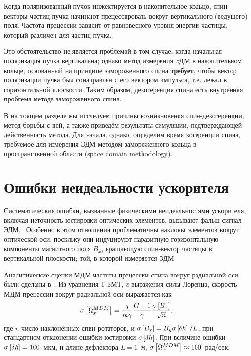 Когда поляризованный пучок инжектируется в накопительное кольцо, спин-векторы 
частиц пучка начинают прецессировать вокруг вертикального
(ведущего) поля. Частота прецессии зависит от равновесного уровня
энергии частицы, который различен для частиц пучка.

Это обстоятельство не является проблемой в том случае, когда начальная
поляризация пучка вертикальна; однако метод измерения ЭДМ в
накопительном кольце, основанный
на принципе замороженного спина \textbf{требует}, чтобы вектор поляризации
пучка был сонаправлен с его вектором импульса, т.е. лежал в
горизонтальной плоскости. Таким образом, декогеренция спина есть
внутренняя проблема метода замороженного спина.

В настоящем разделе мы исследуем причины возникновения спин-декогеренции,
метод борьбы с ней, а также приведём результаты симуляции, подтверждающей действенность
метода. Для начала, однако, определим время когеренции спина, требуемое для 
измерения ЭДМ методом замороженного кольца в пространственной области (space domain methodology).



\section{Ошибки неидеальности ускорителя}\label{chpt3:imperfections}
Систематические ошибки, вызванные физическими неидеальностями
ускорителя, включая неточность юстировки оптических элементов,
вызывают фальш-сигнал ЭДМ.~\cite[стр.~230]{Eremey:Thesis} Особенно в
этом отношении проблематичны наклоны элементов вокруг оптической оси, поскльку они
индуцируют паразитную горизонтальную компоненты магнитного поля $B_x$, 
вращающую спин-вектор частицы в вертикальной плоскости; той, в которой измеряется ЭДМ.

Аналитические оценки МДМ частоты прецессии спина вокруг радиальной оси 
были сделаны в~\cite{Senichev:FDM}. 
Из уравнения Т-БМТ, и выражения силы Лоренца,
скорость МДМ прецессии вокруг радиальной оси выражается как
\begin{equation}\label{eq:tilted-MDM-precession-freq}
\SD{\W_x^{MDM}} = \frac{q}{m\gamma}\frac{G+1}{\gamma}\frac{\SD{B_x}}{\sqrt{n}},
\end{equation}
где $n$ число наклонённых спин-ротаторов, и ${\SD{B_x} = B_y\SD{\delta h}/L}$, 
при стандартном отклонении ошибки юстировки
$\SD{\delta h}$. При величине ошибки ${\SD{\delta h} = 100}$~мкм, и
длине дефлектора $L=1$~м, ${\SD{\W_x^{MDM}} \approx 100}$~рад/сек.~\cite{Senichev:FDM}

